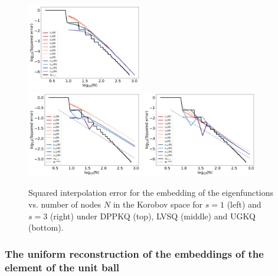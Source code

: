 \documentclass[twoside,11pt]{book}
\numberwithin{theorem}{chapter}
\numberwithin{definition}{chapter}
\numberwithin{proposition}{chapter}
\numberwithin{corollary}{chapter}
\numberwithin{example}{chapter}
\numberwithin{lemma}{chapter}
\numberwithin{assumption}{chapter}
\begin{document}
\begin{figure}
\includegraphics[width=0.45\textwidth]{img/neurips/multiSobolev/LVSQ_multig_interpolation_Korobov_s_2_fig_1.pdf}\\
\includegraphics[width=0.45\textwidth]{img/neurips/multiSobolev/UGKQ_multig_interpolation_Korobov_s_1_fig_1.pdf}
\includegraphics[width=0.45\textwidth]{img/neurips/multiSobolev/UGKQ_multig_interpolation_Korobov_s_2_fig_1.pdf}\\
\caption{Squared interpolation error for the embedding of the eigenfunctions vs. number of nodes $N$ in the Korobov space for $s = 1$ (left) and $s=3$ (right) under DPPKQ (top), LVSQ (middle) and UGKQ (bottom).
\label{fig:Korobov_multig_results}}
\end{figure} 

\subsubsection{The uniform reconstruction of the embeddings of the element of the unit ball}
\end{document}
